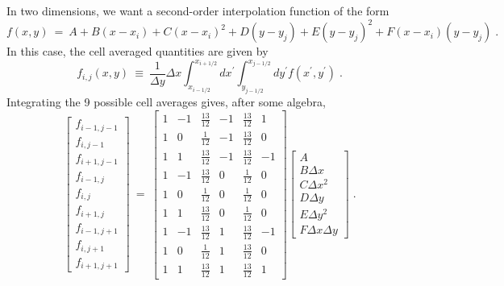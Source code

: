 In two dimensions, we  want a second-order interpolation function of the form
\begin{equation}
f\left(x,y\right) \: = \: A + B \left(x - x_i\right) + C \left(x - x_i\right)^2
+ D \left(y - y_j\right) + E \left(y - y_j\right)^2 +
F \left(x - x_i\right)\left(y - y_j\right) \; .
\end{equation}
In this case, the cell averaged quantities are given by
\begin{equation}
f_{i,j}\left(x,y\right) \: \equiv \: \frac{1}{\Delta y}{\Delta x} \int_{x_{i-1/2}}^{x_{i+1/2}}
dx^\prime
\int_{y_{j-1/2}}^{x_{j-1/2}}  dy^\prime
f\left(x^\prime,y^\prime \right) \; .
\end{equation}
Integrating the 9 possible cell averages gives, after some algebra,
\begin{equation}
\left[ \begin{array}{c}
f_{i-1,j-1} \\ f_{i,j-1} \\ f_{i+1,j-1} \\
f_{i-1,j} \\ f_{i,j} \\ f_{i+1,j} \\
f_{i-1,j+1} \\ f_{i,j+1} \\ f_{i+1,j+1}
\end{array} \right] \: = \:
\left[ \begin{array}{cccccc}
1 & -1 & \frac{13}{12} & -1 &  \frac{13}{12} &  1 \\
1 &  0 & \frac{1}{12}  & -1 &  \frac{13}{12} &  0 \\
1 &  1 & \frac{13}{12} & -1 &  \frac{13}{12} & -1 \\
1 & -1 & \frac{13}{12} &  0 &  \frac{1}{12}  &  0 \\
1 &  0 & \frac{1}{12}  &  0 &  \frac{1}{12}  &  0 \\
1 &  1 & \frac{13}{12} &  0 &  \frac{1}{12}  &  0 \\
1 & -1 & \frac{13}{12} &  1 &  \frac{13}{12} & -1 \\
1 &  0 & \frac{1}{12}  &  1 &  \frac{13}{12} &  0 \\
1 &  1 & \frac{13}{12} &  1 &  \frac{13}{12} &  1
\end{array} \right]
\left[ \begin{array}{c}
A \\ B\Delta x \\ C \Delta x^2 \\
D \Delta y \\ E \Delta y^2 \\ F \Delta x \Delta y
\end{array} \right] \; .
\end{equation}
